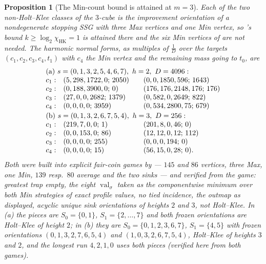\documentclass[11pt]{article}
\theoremstyle{plain}
\newtheorem{proposition}[theorem]{Proposition}
\theoremstyle{definition}
\DeclareMathOperator{\val}{val}
\begin{document}
\begin{proposition}[The Min-count bound is attained at $m=3$]\label{prop:m3-one-min}
Each of the two non-Holt--Klee classes of the $3$-cube is the improvement
orientation of a nondegenerate stopping SSG with three Max vertices and
\emph{one} Min vertex, so 's bound
$k\ge\log_2\chi_{\mathrm{HK}}=1$ is attained there and the six Min vertices
of  are not needed. The harmonic normal forms, as
multiples of $\tfrac1{D}$ over the targets $(c_1,c_2,c_3,c_4,t_1)$ with
$c_4$ the Min vertex and the remaining mass going to $t_0$, are
\[
 \begin{array}{r@{\quad}l@{\qquad}l}
  \multicolumn{3}{l}{\text{(a) } s=(0,1,3,2,5,4,6,7),\ h=2,\ D=4096:}\\
  c_1: & (5,298,1722,0;\,2050)   & (0,0,1850,596;\,1643)\\
  c_2: & (0,188,3900,0;\,0)      & (176,176,2148,176;\,176)\\
  c_3: & (27,0,0,2682;\,1379)    & (0,582,0,2649;\,822)\\
  c_4: & (0,0,0,0;\,3959)        & (0,534,2800,75;\,679)\\[2pt]
  \multicolumn{3}{l}{\text{(b) } s=(0,1,3,2,6,7,5,4),\ h=3,\ D=256:}\\
  c_1: & (219,7,0,0;\,1)         & (201,8,0,46;\,0)\\
  c_2: & (0,0,153,0;\,86)        & (12,12,0,12;\,112)\\
  c_3: & (0,0,0,0;\,255)         & (0,0,0,194;\,0)\\
  c_4: & (0,0,0,0;\,15)          & (56,15,0,28;\,0).
 \end{array}
\]
Both were built into explicit fair-coin games by  ---
$145$ and $86$ vertices, three Max, one Min, $139$ resp.\ $80$ average and
the two sinks --- and verified from the game: greatest trap empty, the
eight $\val_\sigma$ taken as the componentwise minimum over both Min
strategies of exact profile values, no tied incidence, the outmap as
displayed, acyclic unique sink orientations of heights $2$ and $3$, not
Holt--Klee. In (a) the pieces are $S_0=\{0,1\}$, $S_1=\{2,\dots,7\}$ and
both frozen orientations are Holt--Klee of height $2$; in (b) they are
$S_0=\{0,1,2,3,6,7\}$, $S_1=\{4,5\}$ with frozen orientations
$(0,1,3,2,7,6,5,4)$ and $(1,0,3,2,6,7,5,4)$, Holt--Klee of heights $3$ and
$2$, and the longest run $4,2,1,0$ uses both pieces (verified here from
both games).
\end{proposition}
\end{document}
